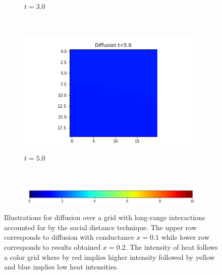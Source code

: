 \documentclass[10pt,a4paper]{article}
\begin{document}
\begin{enumerate}[i)]
\begin{enumerate}[a)]
\begin{figure}[!h]
\begin{subfigure}[b]{0.25\textwidth}
    				\caption{$t=3.0$}
    				\label{gridt3x02}
    			\end{subfigure}~
    			\begin{subfigure}[b]{0.25\textwidth}
    				\includegraphics[width= \textwidth]{images/grid-t5-x02.png}
    				\caption{$t=5.0$}
    				\label{gridt5x02}
    			\end{subfigure}\\
    			\vspace{0.25cm}
    			\begin{subfigure}[b]{0.60\textwidth}
    				\includegraphics[width= \textwidth]{images/colour-bar-grid.png}
    			\end{subfigure}
    			\caption{Illustrations for diffusion over a grid with long-range interactions accounted for by the social distance technique. The upper row corresponds to diffusion with conductance $x=0.1$ while lower row corresponds to results obtained $x=0.2$. The intensity of heat follows a color grid where by red implies higher intensity followed by yellow and blue implies low heat intensities.}
    			\label{gridlongrange}
    		\end{figure}
    		

\end{enumerate}
\end{enumerate}
\end{document}
